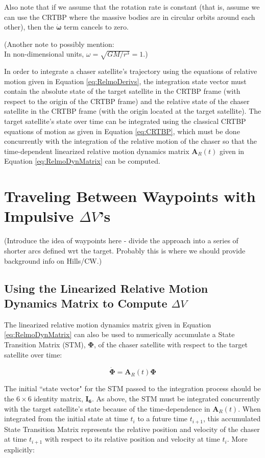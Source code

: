 \documentclass[]{article}
\begin{document}
Also note that if we assume that the rotation rate is constant (that is, assume we can use the CRTBP where the massive bodies are in circular orbits around each other), then the \(\boldsymbol{\dot{\omega}}\) term cancels to zero.

(Another note to possibly mention: \\ In non-dimensional units, \(\omega = \sqrt{GM/r^3} = 1\).)

In order to integrate a chaser satellite's trajectory using the equations of relative motion given in Equation \ref{eq:RelmoDerivs}, the integration state vector must contain the absolute state of the target satellite in the CRTBP frame (with respect to the origin of the CRTBP frame) and the relative state of the chaser satellite in the CRTBP frame (with the origin located at the target satellite).  The target satellite's state over time can be integrated using the classical CRTBP equations of motion as given in Equation \ref{eq:CRTBP}, which must be done concurrently with the integration of the relative motion of the chaser so that the time-dependent linearized relative motion dynamics matrix \(\mathbf{A}_R(t)\) given in Equation \ref{eq:RelmoDynMatrix} can be computed.

\section{Traveling Between Waypoints with Impulsive \(\Delta V\)'s}

(Introduce the idea of waypoints here - divide the approach into a series of shorter arcs defined wrt the target.  Probably this is where we should provide background info on Hills/CW.)

\subsection{Using the Linearized Relative Motion Dynamics Matrix to Compute \(\Delta V\)}

The linearized relative motion dynamics matrix given in Equation \ref{eq:RelmoDynMatrix} can also be used to numerically accumulate a State Transition Matrix (STM), \(\boldsymbol{\Phi}\), of the chaser satellite with respect to the target satellite over time:

\begin{equation} \label{eq:STM}
\dot{\boldsymbol{\Phi}} = \mathbf{A}_R(t)\boldsymbol{\Phi}
\end{equation}

The initial ``state vector" for the STM passed to the integration process should be the \(6\times6\) identity matrix, \(\mathbf{I_6}\).  As above, the STM must be integrated concurrently with the target satellite's state because of the time-dependence in \(\mathbf{A}_R(t)\).  When integrated from the initial state at time \(t_i\) to a future time \(t_{i+1}\), this accumulated State Transition Matrix represents the relative position and velocity of the chaser at time \(t_{i+1}\) with respect to its relative position and velocity at time \(t_i\).  More explicitly:
\end{document}
